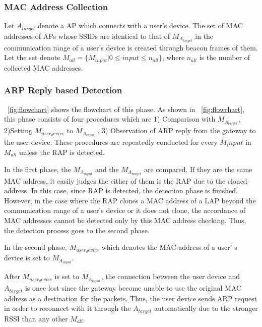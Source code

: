 \documentclass[conference]{IEEEtran}
\newcommand{\tarMAC}{M_{A_{target}}}
\newcommand{\userMAC}{M_{user_device}}
\newcommand{\tarAP}{A_{target}}
\begin{document}
\subsubsection{MAC Address Collection}
Let $\tarAP$ denote a AP which connects with a user's device.
The set of MAC addresses of APs whose SSIDs are identical to that of $\tarMAC$  in the communication range of a user's device is created through beacon frames of them. 
Let the set denote $M_{all}=\{M_{input}|0\le input \le n_{all}  \}$, where $n_{all}$ is the number of collected MAC addresses.

\subsubsection{ARP Reply based Detection}
\figurename~\ref{fig:flowchart} shows the flowchart of this phase.
As shown in \figurename~\ref{fig:flowchart}, this phase consists of four procedures which are 1) Comparison with $\tarMAC$, 2)Setting $\userMAC$ to \newcommand{\inputMAC}{M_{A_{input}}}$\inputMAC$ , 3) Observation of ARP reply from the gateway to the user device.
These procedures are repeatedly conducted for every $M_input$ in $M_{all}$ unless the RAP is detected.

In the first phase, the $\inputMAC$ and the $\tarMAC$ are compared.
If they are the same MAC address, it easily judges the either of them is the RAP due to the cloned address.
In this case, since RAP is detected, the detection phase is finished.
However, in the case where the RAP clones a MAC address of a LAP beyond the communication range of a user's device or it does not clone, the accordance of MAC addresses cannot be detected only by this MAC address checking.
Thus, the detection process goes to the second phase.

In the second phase, $\userMAC$ which denotes the MAC address of a user' s device is set to $\inputMAC$.

After $\userMAC$ is set to $\inputMAC$, the connection between the user device and $\tarAP$ is once lost since the gateway become unable to use the original MAC address as a destination for the packets.
Thus, the user device sends ARP request in order to reconnect with it through the $\tarAP$ automatically due to the stronger RSSI than any other $M_{all}$.
\end{document}
